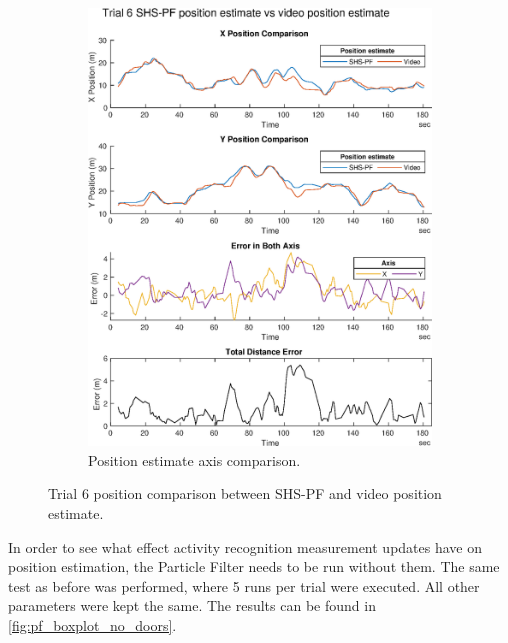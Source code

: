 \begin{figure}[H]
\begin{subfigure}[t]{.45\textwidth}
 		\includegraphics[width=\linewidth]{images/20201129_1858_trial_6_traj_1}
 		\caption{Position estimate axis comparison.}
 		\label{fig:shspf_trial6_comparison}
 	\end{subfigure}
 	\caption{Trial 6 position comparison between SHS-PF and video position estimate.}
 	\label{fig:shspf_trial6_shs_gt_comparison}
 \end{figure}

 In order to see what effect activity recognition measurement updates have on position estimation, the Particle Filter needs to be run without them. The same test as before was performed, where 5 runs per trial were executed. All other parameters were kept the same. The results can be found in \cref{fig:pf_boxplot_no_doors}.
 
